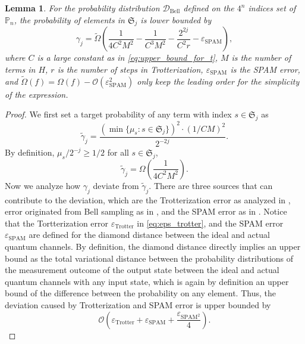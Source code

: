 \documentclass[twocolumn,superscriptaddress,aps,showpacs,amsmath,amstex,amssymb,citeautoscript,floatfix,pra,preprintnumbers]{revtex4-2}
\newtheorem{lemma}[theorem]{Lemma}
\theoremstyle{plain}
\theoremstyle{plain}
\theoremstyle{plain}
\theoremstyle{plain}
\theoremstyle{plain}
\theoremstyle{plain}
\begin{document}
\begin{appendix}
\begin{lemma}
\label{lem:lower_bound_for_prob_dist}
    For the probability distribution $\mathcal{D}_{\text{Bell}}$ defined on the $4^n$ indices set of $\mathbb{P}_n$, the probability of elements in $\mathfrak{S}_j$ is lower bounded by
    \begin{equation}
        \gamma_j = \widetilde{\Omega}\left(\frac{1}{4C^2M^2}-\frac{1}{C^3M^2}-\frac{2^{2j}}{C^2r}-\varepsilon_{\text{SPAM}}\right),
    \end{equation}
    where $C$ is a large constant as in \eqref{eq:upper_bound_for_t}, $M$ is the number of terms in $H$, $r$ is the number of steps in Trotterization,  $\varepsilon_{\text{SPAM}}$ is the SPAM error, and $\widetilde{\Omega}(f) = \Omega(f)-\mathcal{O}(\varepsilon_{\text{SPAM}}^2)$ only keep the leading order for the simplicity of the expression.
\end{lemma}
\begin{proof}
    We first set a target probability of any term with index $s\in\mathfrak{S}_j$ as
    \begin{equation}
        \tilde{\gamma}_j = \frac{\left(\min\{\mu_s:s\in\mathfrak{S}_j\}\right)^2\cdot(1/CM)^2}{2^{-2j}}.
    \end{equation}
By definition, $\mu_s/2^{-j}\geq 1/2$ for all $s\in\mathfrak{S}_j$, 
\begin{equation}
    \tilde{\gamma}_j = \Omega\left(\frac{1}{4C^2M^2}\right).
\end{equation}
Now we analyze how $\gamma_j$ deviate from $\tilde{\gamma}_j$. There are three sources that can contribute to the deviation, which are the Trotterization error as analyzed in , error originated from Bell sampling as in , and the SPAM error as in . Notice that the Tortterization error $\varepsilon_{\text{Trotter}}$ in \eqref{eq:eps_trotter}, and the SPAM error $\varepsilon_{\text{SPAM}}$ are defined for the diamond distance between the ideal and actual quantum channels. By definition, the diamond distance directly implies an upper bound as the total variational distance between the probability distributions of the measurement outcome of the output state between the ideal and actual quantum channels with any input state, which is again by definition an upper bound of the difference between the probability on any element. Thus, the deviation caused by Trotterization and SPAM error is upper bounded by
\[
\mathcal{O}\left(\varepsilon_{\text{Trotter}}+\varepsilon_{\text{SPAM}}+\frac{\varepsilon_{\text{SPAM}^2}}{4}\right).
\]


\end{proof}
\end{appendix}
\end{document}
